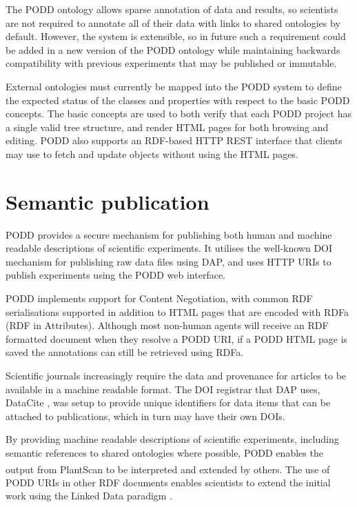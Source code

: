 \documentclass{llncs}
\begin{document}
The PODD ontology allows sparse annotation of data and results, so scientists
are not required to annotate all of their data with links to shared ontologies
by default. However, the system is extensible, so in future such a requirement
could be added in a new version of the PODD ontology while maintaining backwards
compatibility with previous experiments that may be published or immutable.


External ontologies must currently be mapped into the PODD system to define the
expected status of the classes and properties with respect to the basic PODD
concepts. The basic concepts are used to both verify that each PODD project has
a single valid tree structure, and render HTML pages for both browsing and
editing. PODD also supports an RDF-based HTTP REST interface that clients may
use to fetch and update objects without using the HTML pages.


\section{Semantic publication}
PODD provides a secure mechanism for publishing both human and machine readable
descriptions of scientific experiments. It utilises the well-known DOI mechanism
for publishing raw data files using DAP, and uses HTTP URIs to publish
experiments using the PODD web interface.


PODD implements support for Content Negotiation, with common RDF serialisations
supported in addition to HTML pages that are encoded with RDFa (RDF in
Attributes). Although most non-human agents will receive an RDF formatted
document when they resolve a PODD URI, if a PODD HTML page is saved the
annotations can still be retrieved using RDFa. 


Scientific journals increasingly require the data and provenance for articles to
be available in a machine readable format. The DOI registrar that DAP uses,
DataCite \cite{Brase2009}, was setup to provide unique identifiers for data
items that can
be attached to publications, which in turn may have their own DOIs.


By providing machine readable descriptions of scientific experiments, including
semantic references to shared ontologies where possible, PODD enables the output
from PlantScan\textsuperscript{\texttrademark} to be interpreted and extended by
others. The use of PODD URIs
in other RDF documents enables scientists to extend the initial work using the
Linked Data paradigm \cite{BernersLee}.
\end{document}

